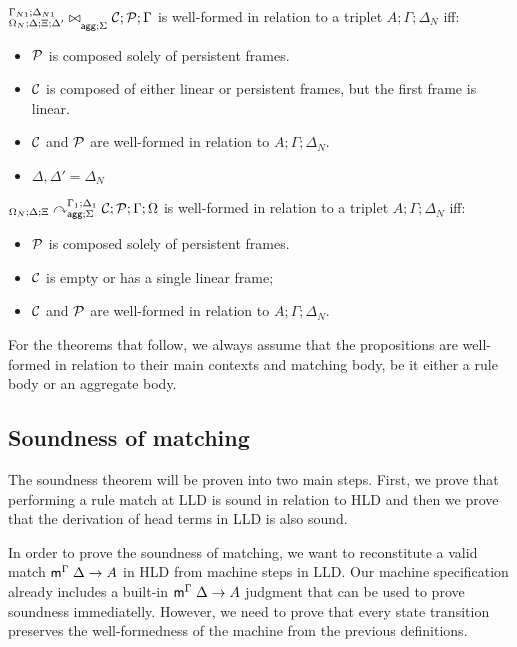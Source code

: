 \begin{definition}
${{}^{\Gamma_{N1} ; \Delta_{N1}}_{\Omega_N ; \Delta; \Xi; \Delta'}\bowtie}_{\mathsf{agg} ; \Sigma} \; \mathcal{C}; \mathcal{P} ; \Gamma$ is
well-formed in relation to a triplet $A; \Gamma; \Delta_{N}$ iff:

\begin{itemize}[leftmargin=*]
   \item $\mathcal{P}$ is composed solely of persistent frames.
   \item $\mathcal{C}$ is composed of either linear or persistent frames, but the first
   frame is linear.
   \item $\mathcal{C}$ and $\mathcal{P}$ are well-formed in relation to $A; \Gamma; \Delta_{N}$.
   \item $\Delta, \Delta' = \Delta_{N}$
\end{itemize}
\end{definition}

\begin{definition}
${{}_{\Omega_N ; \Delta ; \Xi}\curvearrowright}_{\mathsf{agg} ; \Sigma}^{\Gamma_1; \Delta_1} \; \mathcal{C};
      \mathcal{P} ; \Gamma ; \Omega$
is well-formed in relation to a triplet $A; \Gamma; \Delta_{N}$ iff:

\begin{itemize}[leftmargin=*]
   \item $\mathcal{P}$ is composed solely of persistent frames.
   \item $\mathcal{C}$ is empty or has a single linear frame;
   \item $\mathcal{C}$ and $\mathcal{P}$ are well-formed in relation to $A; \Gamma; \Delta_{N}$.
\end{itemize}

\end{definition}

For the theorems that follow, we always assume that the propositions are
well-formed in relation to their main contexts and matching body, be it either a
rule body or an aggregate body.

\subsection{Soundness of matching}

The soundness theorem will be proven into two main steps. First, we prove that
performing a rule match at LLD is sound in relation to HLD and then we prove
that the derivation of head terms in LLD is also sound.

In order to prove the soundness of matching, we want to reconstitute a valid
match $\mathsf{m}^{\Gamma} \; \Delta \rightarrow A$ in HLD from machine steps in LLD. Our machine
specification already includes a built-in $\mathsf{m}^{\Gamma} \; \Delta \rightarrow A$ judgment that
can be used to prove soundness immediatelly. However, we need to prove that
every state transition preserves the well-formedness of the machine from the
previous definitions.

